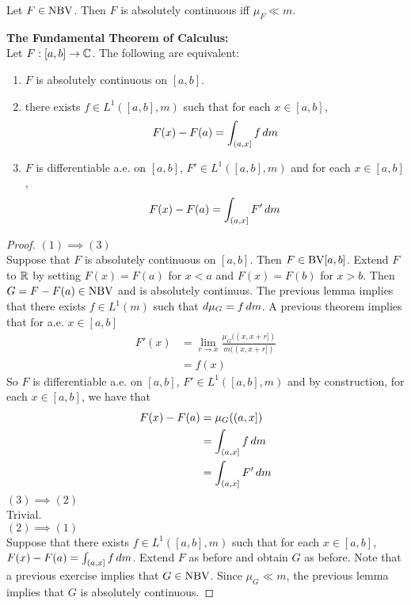 \documentclass{book}
\begin{document}
	\begin{lem}
		Let $F \in \text{NBV}$. Then $F$ is absolutely continuous iff $\mu_F \ll m$.
	\end{lem}
	
	\begin{ex}  \textbf{The Fundamental Theorem of Calculus:}\\
		Let $F:[a,b] \rightarrow \mathbb{C}$. The following are equivalent:
		\begin{enumerate}
			\item $F$ is absolutely continuous on $[a,b]$.
			\item there exists $f \in L^1([a,b], m)$ such that for each $x \in [a,b]$, 
			$$F(x)-F(a)= \int_{(a,x]}f\, d m$$
			\item $F$ is differentiable a.e. on $[a,b]$, $F' \in L^1([a,b], m)$ and for each $x \in [a,b]$, 
			$$F(x)-F(a)=\int_{(a,x]}F'\, d m$$
		\end{enumerate}
	\end{ex}
	
	\begin{proof}
		$(1) \implies (3)$ \\
		Suppose that $F$ is absolutely continuous on $[a,b]$. Then $F \in \text{BV}[a,b]$. Extend $F$ to $\mathbb{R}$ by setting $F(x) = F(a)$ for $x<a$ and $F(x)=F(b)$ for $x>b$. Then $G=F-F(a) \in \text{NBV}$ and is absolutely continuus. The previous lemma implies that there exists $f \in L^1(m)$ such that $d \mu_G = f\, d m$. A previous theorem implies that for a.e. $x \in [a,b]$
		\begin{align*}
			F'(x) 
			&= \lim_{r \rightarrow x} \frac{\mu_G((x,x+r])}{m((x,x+r])}\\
			&= f(x)
		\end{align*}  
		So $F$ is differentiable a.e. on $[a,b]$, $F' \in L^1([a,b], m)$ and by construction, for each $x \in [a,b]$, we have that
		\begin{align*}
			F(x)-F(a)
			&= \mu_G((a,x])\\
			&= \int_{(a,x]}f\, d m\\
			&= \int_{(a,x]}F'\, d m
		\end{align*}
		$(3) \implies (2)$\\
		Trivial.\\
		$(2) \implies (1)$\\
		Suppose that there exists $f \in L^1([a,b], m)$ such that for each $x \in [a,b]$, $F(x)-F(a)=\int_{(a,x]}f\, d m$. Extend $F$ as before and obtain $G$ as before. Note that a previous exercise implies that $G \in \text{NBV}$. Since $\mu_G \ll m$, the previous lemma implies that $G$ is absolutely continuous.
	\end{proof}
	
\end{document}

